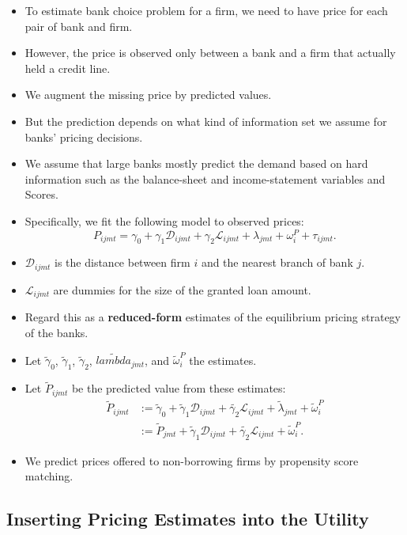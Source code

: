\documentclass[
]{book}
\providecommand{\tightlist}{%
  \setlength{\itemsep}{0pt}\setlength{\parskip}{0pt}}
\begin{document}
\begin{itemize}
\tightlist
\item
  To estimate bank choice problem for a firm, we need to have price for each pair of bank and firm.
\item
  However, the price is observed only between a bank and a firm that actually held a credit line.
\item
  We augment the missing price by predicted values.
\item
  But the prediction depends on what kind of information set we assume for banks' pricing decisions.
\item
  We assume that large banks mostly predict the demand based on hard information such as the balance-sheet and income-statement variables and Scores.
\item
  Specifically, we fit the following model to observed prices:
  \[
  P_{ijmt} = \gamma_0 + \gamma_1 \mathcal{D}_{ijmt} + \gamma_2 \mathcal{L}_{ijmt} + \lambda_{jmt} + \omega_i^P + \tau_{ijmt}.
  \]
\item
  \(\mathcal{D}_{ijmt}\) is the distance between firm \(i\) and the nearest branch of bank \(j\).
\item
  \(\mathcal{L}_{ijmt}\) are dummies for the size of the granted loan amount.
\item
  Regard this as a \textbf{reduced-form} estimates of the equilibrium pricing strategy of the banks.
\item
  Let \(\tilde{\gamma}_0\), \(\tilde{\gamma}_1\), \(\tilde{\gamma}_2\), \(\tilde{lambda}_{jmt}\), and \(\tilde{\omega}_i^P\) the estimates.
\item
  Let \(\tilde{P}_{ijmt}\) be the predicted value from these estimates:
  \begin{equation}
  \begin{split}
  \tilde{P}_{ijmt} &:= \tilde{\gamma}_0 + \tilde{\gamma}_1 \mathcal{D}_{ijmt} + \tilde{\gamma_2} \mathcal{L}_{ijmt} + \tilde{\lambda}_{jmt} + \tilde{\omega}_i^P\\
  &:= \tilde{P}_{jmt} + \tilde{\gamma}_1 \mathcal{D}_{ijmt} + \tilde{\gamma_2} \mathcal{L}_{ijmt} + \tilde{\omega}_i^P.
  \end{split} \label{eq:price-predicted}
  \end{equation}
\item
  We predict prices offered to non-borrowing firms by propensity score matching.
\end{itemize}

\hypertarget{inserting-pricing-estimates-into-the-utility}{%
\subsection{Inserting Pricing Estimates into the Utility}\label{inserting-pricing-estimates-into-the-utility}}
\end{document}
